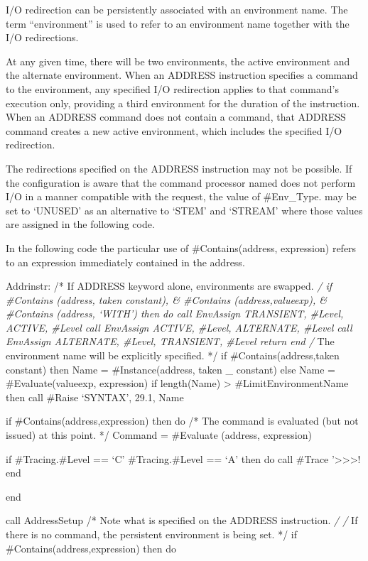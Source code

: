 I/O redirection can be persistently associated with an environment name.
The term ``environment'' is used to refer to an environment name
together with the I/O redirections.

At any given time, there will be two environments, the active
environment and the alternate environment. When an ADDRESS instruction
specifies a command to the environment, any specified I/O redirection
applies to that command's execution only, providing a third environment
for the duration of the instruction. When an ADDRESS command does not
contain a command, that ADDRESS command creates a new active
environment, which includes the specified I/O redirection.

The redirections specified on the ADDRESS instruction may not be
possible. If the configuration is aware that the command processor named
does not perform I/O in a manner compatible with the request, the value
of \#Env\_Type. may be set to `UNUSED' as an alternative to `STEM' and
`STREAM' where those values are assigned in the following code.

In the following code the particular use of \#Contains(address,
expression) refers to an expression immediately contained in the
address.

Addrinstr: /* If ADDRESS keyword alone, environments are swapped.
\emph{/ if \#Contains (address, taken constant), \& \#Contains
(address,valueexp), \& \#Contains (address, `WITH') then do call
EnvAssign TRANSIENT, \#Level, ACTIVE, \#Level call EnvAssign ACTIVE,
\#Level, ALTERNATE, \#Level call EnvAssign ALTERNATE, \#Level,
TRANSIENT, \#Level return end /} The environment name will be explicitly
specified. */ if \#Contains(address,taken constant) then Name =
\#Instance(address, taken \_ constant) else Name = \#Evaluate(valueexp,
expression) if length(Name) \textgreater{} \#LimitEnvironmentName then
call \#Raise `SYNTAX', 29.1, Name

if \#Contains(address,expression) then do /* The command is evaluated
(but not issued) at this point. */ Command = \#Evaluate (address,
expression)

if \#Tracing.\#Level == `C' \textbar{} \#Tracing.\#Level == `A' then do
call \#Trace '\textgreater\textgreater\textgreater! end

end

call AddressSetup /* Note what is specified on the ADDRESS instruction.
\emph{/ /} If there is no command, the persistent environment is being
set. */ if \#Contains(address,expression) then do

